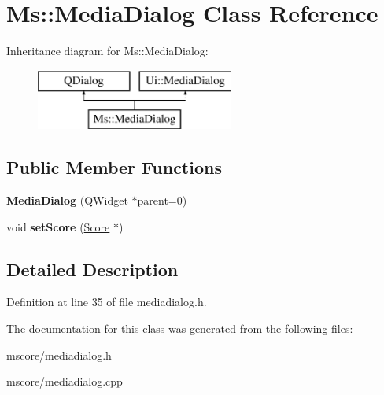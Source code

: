 \hypertarget{class_ms_1_1_media_dialog}{}\section{Ms\+:\+:Media\+Dialog Class Reference}
\label{class_ms_1_1_media_dialog}
Inheritance diagram for Ms\+:\+:Media\+Dialog\+:\begin{figure}[H]
\begin{center}
\leavevmode
\includegraphics[height=2.000000cm]{class_ms_1_1_media_dialog}
\end{center}
\end{figure}
\subsection*{Public Member Functions}
\begin{DoxyCompactItemize}
\item 
\mbox{\label{class_ms_1_1_media_dialog_a7892ccee992e881001747eb3bb4ed82a}} 
{\bfseries Media\+Dialog} (Q\+Widget $\ast$parent=0)
\item 
\mbox{\label{class_ms_1_1_media_dialog_a826fa7461472aff835cbe90af0f336e3}} 
void {\bfseries set\+Score} (\hyperlink{class_ms_1_1_score}{Score} $\ast$)
\end{DoxyCompactItemize}


\subsection{Detailed Description}


Definition at line 35 of file mediadialog.\+h.



The documentation for this class was generated from the following files\+:\begin{DoxyCompactItemize}
\item 
mscore/mediadialog.\+h\item 
mscore/mediadialog.\+cpp\end{DoxyCompactItemize}
